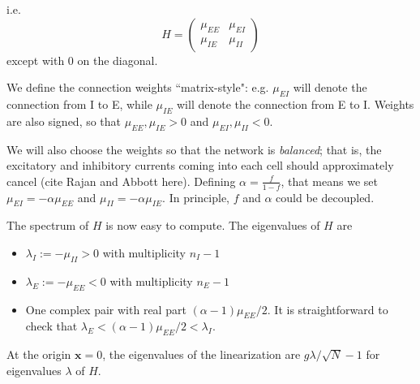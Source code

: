 \documentclass[11pt,reqno]{amsart}
\newcommand{\xvec}{\mathbf{x}}
\begin{document}
i.e.
\[
H = \begin{pmatrix}
\mu_{EE} & \mu_{EI} \\ \mu_{IE} & \mu_{II}
\end{pmatrix}
\]
except with 0 on the diagonal.

We define the connection weights ``matrix-style": e.g. $\mu_{EI}$ will denote the connection from I to E, while
$\mu_{IE}$ will denote the connection from E to I. Weights are also signed, so that $\mu_{EE}, \mu_{IE} > 0$ and $\mu_{EI}, \mu_{II} < 0$.

We will also choose the weights so that the network is \emph{balanced}; that is, the excitatory and inhibitory currents coming into each cell should approximately cancel (cite Rajan and Abbott here). Defining $\alpha = \frac{f}{1-f}$, that means we set $\mu_{EI} = -\alpha \mu_{EE}$ and $\mu_{II} = -\alpha \mu_{IE}$. In principle, $f$ and $\alpha$ could be decoupled.

The spectrum of $H$ is now easy to compute. The eigenvalues of $H$ are

\begin{itemize}
    \item $\lambda_I := -\mu_{II} > 0$ with multiplicity $n_I - 1$
    \item $\lambda_E := -\mu_{EE} < 0$ with multiplicity $n_E - 1$
    \item One complex pair with real part $(\alpha - 1)\mu_{EE}/2$. It is straightforward to check that $\lambda_E < (\alpha - 1)\mu_{EE}/2 < \lambda_I$.
\end{itemize}
At the origin $\xvec = 0$, the eigenvalues of the linearization are $g \lambda / \sqrt{N} - 1$ for eigenvalues $\lambda$ of $H$.
\end{document}
